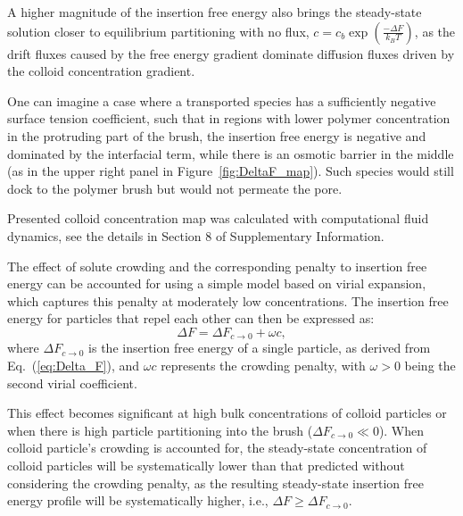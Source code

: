 \documentclass[12pt, a4paper]{article}
\newcommand\todo[1]{\textcolor{red}{#1}}
\begin{document}
A higher magnitude of the insertion free energy also brings the steady-state solution closer to equilibrium partitioning with no flux, $c = c_{b} \exp\left( \frac{-\Delta F}{k_B T} \right)$, as the drift fluxes caused by the free energy gradient dominate diffusion fluxes driven by the colloid concentration gradient.

One can imagine a case where a transported species has a sufficiently negative surface tension coefficient, such that in regions with lower polymer concentration in the protruding part of the brush, the insertion free energy is negative and dominated by the interfacial term, while there is an osmotic barrier in the middle (as in the upper right panel in Figure~\ref{fig:DeltaF_map}).
Such species would still dock to the polymer brush but would not permeate the pore.


Presented colloid concentration map was calculated with computational fluid dynamics, see the details in 
Section 8 of Supplementary Information.


The effect of solute crowding and the corresponding penalty to insertion free energy can be accounted for using a simple model based on virial expansion, which captures this penalty at moderately low concentrations.
The insertion free energy for particles that repel each other can then be expressed as:
\begin{equation}
    \Delta F = \Delta F_{c \to 0} + \omega c,
\end{equation}
where $\Delta F_{c \to 0}$ is the insertion free energy of a single particle, as derived from Eq.~(\ref{eq:Delta_F}), and $\omega c$ represents the crowding penalty, with $\omega > 0$ being the second virial coefficient.

This effect becomes significant at high bulk concentrations of colloid particles or when there is high particle partitioning into the brush ($\Delta F_{c \to 0} \ll 0$). 
When colloid particle's crowding is accounted for, the steady-state concentration of colloid particles will be systematically lower than that predicted without considering the crowding penalty, as the resulting steady-state insertion free energy profile will be systematically higher, i.e., $\Delta F \ge \Delta F_{c \to 0}$.
\end{document}

